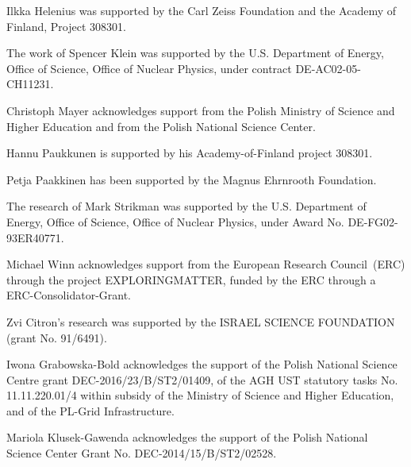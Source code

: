 Ilkka Helenius was supported by the Carl Zeiss Foundation and the Academy of Finland, Project 308301.

The work of Spencer Klein was supported by the U.S. Department of Energy, Office of Science, Office of Nuclear Physics, under contract DE-AC02-05-CH11231.

Christoph Mayer acknowledges support from the Polish Ministry of Science and
Higher Education and from the Polish National Science Center.

Hannu Paukkunen is supported by his Academy-of-Finland project 308301.

Petja Paakkinen has been supported by the Magnus Ehrnrooth Foundation.


The research of Mark Strikman was supported by the U.S. Department of Energy, Office of Science, Office of Nuclear Physics, under Award No. DE-FG02-93ER40771.

Michael Winn acknowledges support from the European Research Council~(ERC) through the project EXPLORINGMATTER, funded by the ERC through a ERC-Consolidator-Grant.




Zvi Citron's research was supported by the ISRAEL SCIENCE FOUNDATION (grant No. 91/6491).

Iwona Grabowska-Bold acknowledges the support of the Polish National Science Centre grant DEC-2016/23/B/ST2/01409, of the AGH UST statutory tasks No. 11.11.220.01/4 within subsidy of the Ministry of Science and Higher Education, and of the PL-Grid Infrastructure.

Mariola Klusek-Gawenda acknowledges the support of the Polish National Science Center Grant No. DEC-2014/15/B/ST2/02528.
